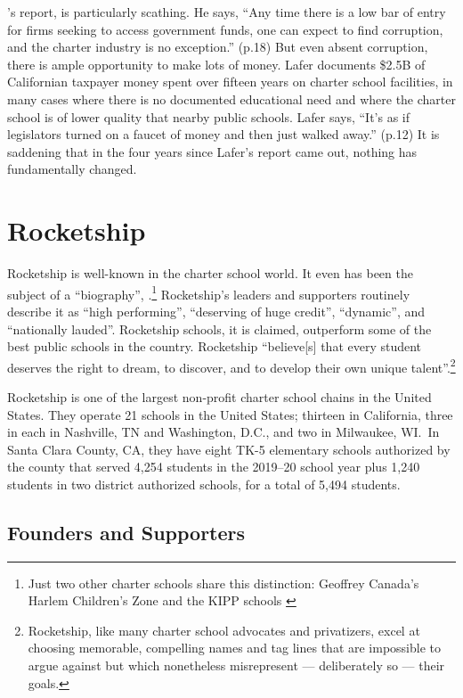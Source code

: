 \textcite{Lafer2017}'s report,  is particularly scathing. He says,
``Any time there is a low bar of entry for firms seeking to access government funds, one can expect to find corruption, and the charter industry is no exception.'' (p.18) But even absent corruption, there is ample opportunity to make lots of money. Lafer documents \$2.5B of Californian taxpayer money spent over fifteen years on charter school facilities, in many cases where there is no documented educational need and where the charter school is of lower quality that nearby public schools. Lafer says, ``It's as if legislators turned on a faucet of money and then just walked away.'' (p.12) It is saddening that in the four years since Lafer's report came out, nothing has fundamentally changed.

\section{Rocketship}\label{sec:rocketship}\indent

Rocketship is well-known in the charter school world. It even has been the subject of a ``biography'',  \parencite{Whitmire2014}.\footnote{Just two other charter schools share this distinction: Geoffrey Canada's Harlem Children's Zone \parencite{Tough2009} and the KIPP schools \parencite{Mathews2009, Horn2016}}  Rocketship's leaders and supporters routinely describe it as ``high performing'', ``deserving of huge credit'', ``dynamic'', and ``nationally lauded''. Rocketship schools, it is claimed, outperform some of the best public schools in the country. Rocketship ``believe[s] that every student deserves the right to dream, to discover, and to develop their own unique talent''.\footnote{Rocketship, like many charter school advocates and privatizers, excel at choosing memorable, compelling names and tag lines that are impossible to argue against but which nonetheless misrepresent — deliberately so — their goals.}

Rocketship is one of the largest non-profit charter school chains in the United States. They operate 21 schools in the United States; thirteen in California, three in each in Nashville, TN and Washington, D.C., and two in Milwaukee, WI.~In Santa Clara County, CA, they have eight TK-5 elementary schools authorized by the county that served 4,254 students in the 2019–20 school year plus 1,240 students in two district authorized schools, for a total of 5,494 students.

\subsection{Founders and Supporters}\label{sec:founders-supporters}\indent

